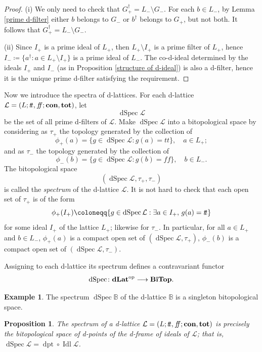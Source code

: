 \documentclass[11pt]{article}
\DeclareMathOperator{\idl}{Idl}
\DeclareMathOperator{\dSpec}{dSpec}
\DeclareMathOperator{\dpt}{dpt}
\theoremstyle{plain}
\newtheorem{prop}[thm]{Proposition}
\theoremstyle{definition}
\newtheorem{exmp}[thm]{Example}
\newcommand{\bbB}{\mathbb{B}}
\newcommand{\dbt}{{t\!t}}
\newcommand{\dbf}{{f\!\!f}}
\newcommand{\lra}{\longrightarrow}
\begin{document}
\begin{proof}(i)  
We only need to check that $G_+^\dag=L_-\setminus G_-$. For each $b\in L_-$, by Lemma \ref{prime d-filter}  either $b$ belongs to $G_-$ or $b^\dag$ belongs to $G_+$, but not both. It follows that $G_+^\dag=L_-\setminus G_-$.

(ii) Since $I_+$ is a prime ideal of $L_+$, then $L_+\setminus I_+$ is a prime filter of $L_+$, hence  $I_-\coloneqq \{a^\dag: a\in L_+\setminus I_+\}$ is a prime ideal of $L_-$. The co-d-ideal determined by the ideals $I_+$ and $I_-$ (as in Proposition \ref{structure of d-ideal}) is also a d-filter,  hence it is the unique prime d-filter  satisfying the requirement. \end{proof} 

Now we introduce the spectra of d-lattices.
For each d-lattice $\mathcal{L}=(L;\dbt,\dbf;{\bf con},{\bf tot})$, let $$\dSpec\mathcal{L} $$ be the set of all prime d-filters of $\mathcal{L}$. Make $\dSpec\mathcal{L} $ into a bitopological space by considering as  $\tau_+$ the topology generated by the collection of $$\phi_+(a)=\{g\in\dSpec\mathcal{L}:g(a)=\dbt\}, \quad a\in L_+; $$ and as  $\tau_-$ the topology generated by the collection of $$\phi_-(b)=\{g\in\dSpec\mathcal{L}:g(b)=\dbf\}, \quad b\in L_-. $$
The bitopological space $$(\dSpec\mathcal{L},\tau_+,\tau_-)$$ is called the \emph{spectrum} of the d-lattice $\mathcal{L}$. It is not hard to check that  each open set  of $\tau_+$ is of the form $$\phi_+(I_+)\coloneqq  
\{g\in\dSpec\mathcal{L}: \exists a\in I_+,\thinspace g(a)=\dbt\}$$ for some ideal $I_+$ of the lattice $L_+$;  likewise for $\tau_-$. In particular,  for all $a\in L_+$ and $b\in L_-$, $\phi_+(a)$ is a compact open set of $(\dSpec\mathcal{L},\tau_+)$, $\phi_-(b)$ is a compact open set of $(\dSpec\mathcal{L},\tau_-)$. 

Assigning to  each d-lattice its spectrum defines a contravariant functor $$\dSpec\colon{\bf dLat}^{\rm op}\lra{\bf BiTop}.$$

\begin{exmp}  The spectrum $\dSpec\bbB$ of the d-lattice $\bbB$   is a singleton bitopological space. \end{exmp}

\begin{prop}\label{spectrum as composite} The spectrum of a d-lattice $\mathcal{L}=(L;\dbt,\dbf;{\bf con},{\bf tot})$ is precisely the bitopological space of d-points of the d-frame of ideals of  $\mathcal{L}$; that is,  $\dSpec\mathcal{L} = \dpt\circ\idl\mathcal{L}$. \end{prop}
\end{document}
